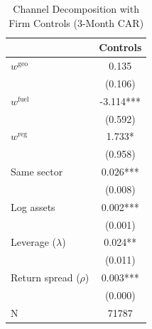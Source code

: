 \begin{table}[!htbp]
\centering
\caption{Channel Decomposition with Firm Controls (3-Month CAR)}
\label{tab:channel_controls}
\begin{tabular}{lc}
\toprule
 & Controls \\
\midrule
$w^{\mathrm{geo}}$ & 0.135 \\
 & (0.106) \\
$w^{\mathrm{fuel}}$ & -3.114*** \\
 & (0.592) \\
$w^{\mathrm{reg}}$ & 1.733* \\
 & (0.958) \\
Same sector & 0.026*** \\
 & (0.008) \\
Log assets & 0.002*** \\
 & (0.001) \\
Leverage ($\lambda$) & 0.024** \\
 & (0.011) \\
Return spread ($\rho$) & 0.003*** \\
 & (0.000) \\
\midrule
N & 71787 \\
\bottomrule
\end{tabular}
\end{table}